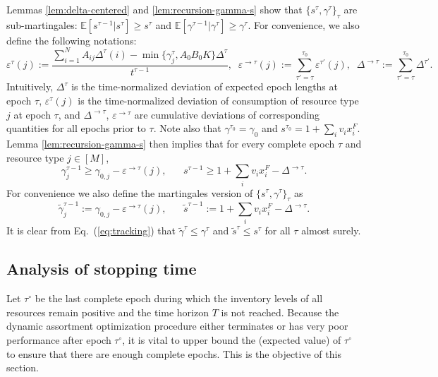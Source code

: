 \documentclass[opre]{informs3aa}
\renewcommand{\tilde}{\widetilde}
\renewcommand{\tilde}{\widetilde}
\begin{document}
{Lemmas \ref{lem:delta-centered} and \ref{lem:recursion-gamma-s} show that} $\{s^\tau,\gamma^\tau\}_\tau$ are sub-martingales: $\mathbb E[s^{\tau-1}|s^\tau]\geq s^\tau$
and $\mathbb E[\gamma^{\tau-1}|\gamma^\tau] \geq \gamma^\tau$.
For convenience, we also define the following notations:
\begin{equation}
\varepsilon^\tau(j):= \frac{\sum_{i=1}^NA_{ij}\Delta^{\tau}(i)-\min\{\gamma^\tau_j,A_0B_0K\}\Delta^\tau}{t^{\tau-1}}, \;\; 
\varepsilon^{\to\tau}(j) := \sum_{\tau'=\tau}^{\tau_0}\varepsilon^{\tau'}(j), \;\;
\Delta^{\to\tau} := \sum_{\tau'=\tau}^{\tau_0}\Delta^{\tau'}.
\label{eq:defn-vareps}
\end{equation}
{Intuitively, $\Delta^\tau$ is the time-normalized deviation of expected epoch lengths at epoch $\tau$, $\varepsilon^\tau(j)$ is the time-normalized deviation of consumption of resource type $j$ at epoch $\tau$, and $\Delta^{\to\tau}$, $\varepsilon^{\to\tau}$ are cumulative deviations of corresponding quantities for all epochs prior to $\tau$.}
Note also that $\gamma^{\tau_0}=\gamma_0$ and $s^{\tau_0} = 1+\sum_i v_ix_i^F$. Lemma \ref{lem:recursion-gamma-s} then implies
that for every complete epoch $\tau$ and resource type $j\in[M]$,
\begin{equation}
\textstyle
\gamma^{\tau-1}_j \geq \gamma_{0,j} - \varepsilon^{\to\tau}(j), \;\;\;\;\;\; s^{\tau-1} \geq 1+\sum_i v_ix_i^F - \Delta^{\to\tau}.
\label{eq:tracking}
\end{equation}
For convenience we also define the martingales version of $\{s^\tau,\gamma^\tau\}_\tau$ as 
\begin{equation}
\tilde\gamma^{\tau-1}_j := \gamma_{0,j} - \varepsilon^{\to\tau}(j), \;\;\;\;\;\; \tilde s^{\tau-1} := 1+\sum_i v_ix_i^F - \Delta^{\to\tau}.
\label{eq:defn-tilde-s-gamma}
\end{equation}
It is clear from Eq.~(\ref{eq:tracking}) that $\tilde\gamma^\tau\leq\gamma^\tau$ and $\tilde s^\tau\leq s^\tau$ for all $\tau$ almost surely.

\subsection{Analysis of stopping time}

Let $\tau^\circ$ be the last complete epoch during which the inventory levels of all resources remain positive and the time horizon $T$ is not reached.
Because the dynamic assortment optimization procedure either terminates or has very poor performance after epoch $\tau^\circ$,
it is vital to upper bound the (expected value) of $\tau^\circ$ to ensure that there are enough complete epochs.
This is the objective of this section.
\end{document}
